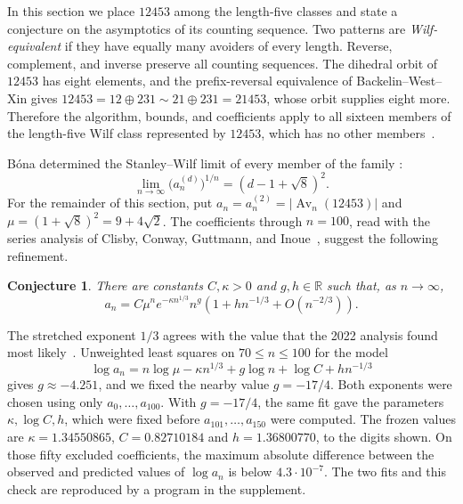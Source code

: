 \documentclass[11pt,reqno]{amsart}
\newtheorem{conjecture}[conjecture]{Conjecture}
\theoremstyle{definition}
\theoremstyle{remark}
\newcommand{\Av}{\operatorname{Av}}
\begin{document}
In this section we place $12453$ among the length-five classes and state a
conjecture on the asymptotics of its counting sequence.  Two patterns are \emph{Wilf-equivalent} if they have equally many avoiders
of every length.  Reverse, complement, and inverse preserve all counting
sequences.  The dihedral orbit of $12453$ has eight elements, and the
prefix-reversal equivalence of Backelin--West--Xin
\cite{BackelinWestXin2007} gives
$12453=12 \oplus 231 \sim 21 \oplus 231=21453$, whose orbit supplies eight more.  Therefore the
algorithm, bounds, and coefficients apply to all sixteen members
of the length-five Wilf class represented by $12453$, which has no other
members~\cite[Table~1]{ClisbyConwayGuttmannInoue2022}.

B\'ona determined the Stanley--Wilf limit of every member of the
family \cite{Bona2005}:
\begin{equation*}
 \lim_{n\to\infty}\bigl(a_n^{(d)}\bigr)^{1/n}=(d-1+\sqrt{8})^2 .
\end{equation*}
For the remainder of this section, put
$a_n=a_n^{(2)}=\lvert\Av_n(12453)\rvert$ and $\mu=(1+\sqrt{8})^2=9+4\sqrt{2}$.
The coefficients through $n=100$, read with the series analysis of Clisby,
Conway, Guttmann, and Inoue~\cite{ClisbyConwayGuttmannInoue2022}, suggest the
following refinement.

\begin{conjecture}\label{conj:12453-asymptotic}
There are constants $C,\kappa>0$ and $g,h\in\mathbb R$ such that, as
$n\to\infty$,
\begin{equation}\label{eq:12453-asymptotic}
 a_n=C\mu^n e^{-\kappa n^{1/3}}n^{g}
 \left(1+h n^{-1/3}+O(n^{-2/3})\right).
\end{equation}
\end{conjecture}

The stretched exponent $1/3$ agrees with the value that the 2022 analysis
found most likely~\cite[Section~10.3]{ClisbyConwayGuttmannInoue2022}.
Unweighted least squares on $70\leq n\leq100$ for the model
\[
 \log a_n=n\log\mu-\kappa n^{1/3}+g\log n+\log C+h n^{-1/3}
\]
gives $g\approx-4.251$, and we fixed the nearby value $g=-17/4$.  Both
exponents were chosen using only $a_0,\ldots,a_{100}$.  With
$g=-17/4$, the same fit gave the parameters $\kappa,\log C,h$, which were
fixed before $a_{101},\ldots,a_{150}$ were computed.  The frozen values are
$\kappa=1.34550865$, $C=0.82710184$ and $h=1.36800770$, to the digits
shown.
On those fifty excluded coefficients, the maximum absolute difference
between the observed and predicted values of $\log a_n$ is below
$4.3\cdot10^{-7}$.  The two fits and this check are reproduced by a
program in the supplement.
\end{document}
